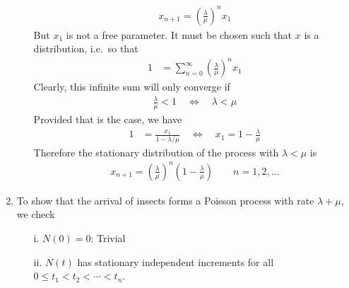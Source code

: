 \documentclass[12pt]{article}
\theoremstyle{plain}
\theoremstyle{definition}
\theoremstyle{remark}
\begin{document}
\begin{enumerate}
\begin{enumerate}
\begin{align*}
        x_{n+1} = \left(\frac{\lambda}{\mu}\right)^n x_1
      \end{align*}
      But $x_1$ is not a free parameter. It must be chosen such that $x$
      is a distribution, i.e.\ so that
      \begin{align*}
        1 &= \sum^\infty_{n=0}
          \left(\frac{\lambda}{\mu}\right)^n x_1
      \end{align*}
      Clearly, this infinite sum will only converge if
      \begin{align*}
        \frac{\lambda}{\mu} < 1
          \quad \Leftrightarrow \quad
        \lambda < \mu
      \end{align*}
      Provided that is the case, we have
      \begin{align*}
        1 &= \frac{x_1}{1-\lambda/\mu}
          \quad \Leftrightarrow \quad
          x_1 = 1-\frac{\lambda}{\mu}
      \end{align*}
      Therefore the stationary distribution of the process with
      $\lambda<\mu$ is
      \begin{align*}
        x_{n+1} =
          \left(\frac{\lambda}{\mu}\right)^n
          \left(1-\frac{\lambda}{\mu} \right)
        \qquad n = 1,2,\ldots
      \end{align*}

    \end{enumerate}

  \item %
    To show that the arrival of insects forms a Poisson process with
    rate $\lambda+\mu$, we check
    \begin{enumerate}
      \item[i.] $N(0) = 0$: Trivial
      \item[ii.] $N(t)$ has stationary independent increments for all
        $0\leq t_1 < t_2< \cdots < t_n$.


\end{enumerate}
\end{enumerate}
\end{document}
